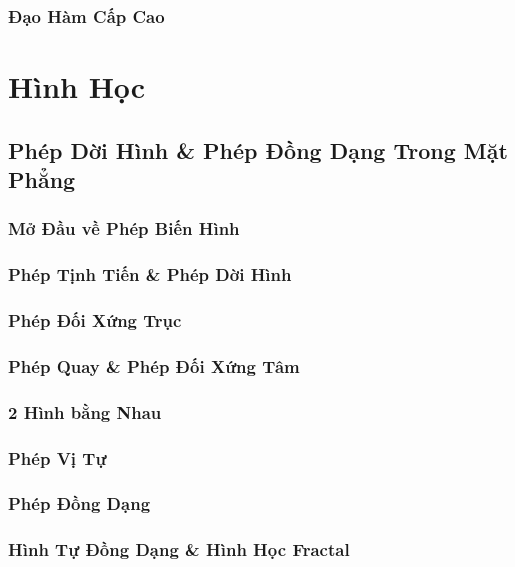 \documentclass[oneside]{book}
\numberwithin{equation}{section}
\begin{document}
\section{Đạo Hàm Cấp Cao}


\part{Hình Học}

\chapter{Phép Dời Hình \& Phép Đồng Dạng Trong Mặt Phẳng}

\section{Mở Đầu về Phép Biến Hình}

\section{Phép Tịnh Tiến \& Phép Dời Hình}

\section{Phép Đối Xứng Trục}

\section{Phép Quay \& Phép Đối Xứng Tâm}

\section{2 Hình bằng Nhau}

\section{Phép Vị Tự}

\section{Phép Đồng Dạng}

\section{Hình Tự Đồng Dạng \& Hình Học Fractal}
\end{document}

